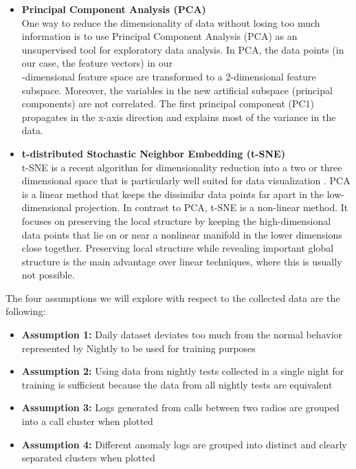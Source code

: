 \begin{itemize} 

\item \textbf{ Principal Component Analysis (PCA)} \\ One way to reduce the dimensionality of data without losing too much information is to use Principal Component Analysis (PCA) as an unsupervised tool for exploratory data analysis. In PCA, the data points (in our case, the feature vectors) in our\\ \featureVectorLength-dimensional feature space are transformed to a 2-dimensional feature subspace. Moreover, the variables in the new artificial subspace (principal components) are not correlated. The first principal component (PC1) propagates in the x-axis direction and explains most of the variance in the data.
    
   \item \textbf{ t-distributed Stochastic Neighbor Embedding (t-SNE)}\\ t-SNE is a recent algorithm for dimensionality reduction into a two or three dimensional space that is particularly well suited for data visualization \cite{tsne}. PCA is a linear method that keeps the dissimilar data points far apart in the low-dimensional projection. In contrast to PCA, t-SNE is a non-linear method. It focuses on preserving the local structure by keeping the high-dimensional data points that lie on or near a nonlinear manifold in the lower dimensions close together. Preserving local structure while revealing important global structure is the main advantage over linear techniques, where this is usually not possible.
    
\end{itemize}

The four assumptions we will explore with respect to the collected data are the following: 

\begin{itemize} \item \textbf{Assumption 1:} Daily dataset deviates too much from the normal behavior represented by Nightly to be used for training purposes \item \textbf{Assumption 2:} Using data from nightly tests collected in a single night for training is sufficient because the data from all nightly tests are equivalent \item \textbf{Assumption 3:} Logs generated from calls between two radios are grouped into a call cluster when plotted \item \textbf{Assumption 4:} Different anomaly logs are grouped into distinct and clearly separated clusters when plotted
\end{itemize}

